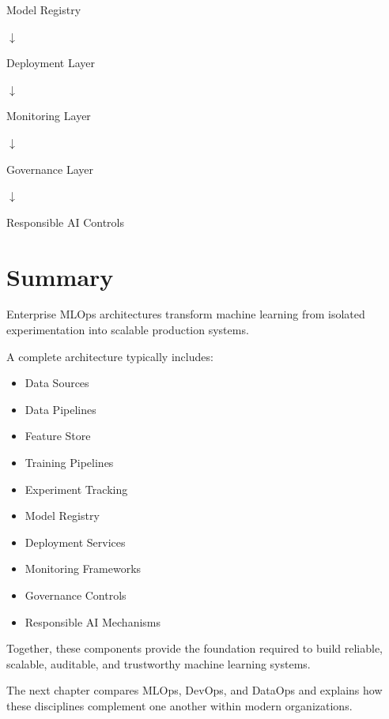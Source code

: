 \begin{center}
Model Registry
\end{center}

\begin{center}
$\downarrow$
\end{center}

\begin{center}
Deployment Layer
\end{center}

\begin{center}
$\downarrow$
\end{center}

\begin{center}
Monitoring Layer
\end{center}

\begin{center}
$\downarrow$
\end{center}

\begin{center}
Governance Layer
\end{center}

\begin{center}
$\downarrow$
\end{center}

\begin{center}
Responsible AI Controls
\end{center}

\section{Summary}

Enterprise MLOps architectures transform machine learning from isolated experimentation into scalable production systems.

A complete architecture typically includes:

\begin{itemize}
    \item Data Sources
    \item Data Pipelines
    \item Feature Store
    \item Training Pipelines
    \item Experiment Tracking
    \item Model Registry
    \item Deployment Services
    \item Monitoring Frameworks
    \item Governance Controls
    \item Responsible AI Mechanisms
\end{itemize}

Together, these components provide the foundation required to build reliable, scalable, auditable, and trustworthy machine learning systems.

The next chapter compares MLOps, DevOps, and DataOps and explains how these disciplines complement one another within modern organizations.